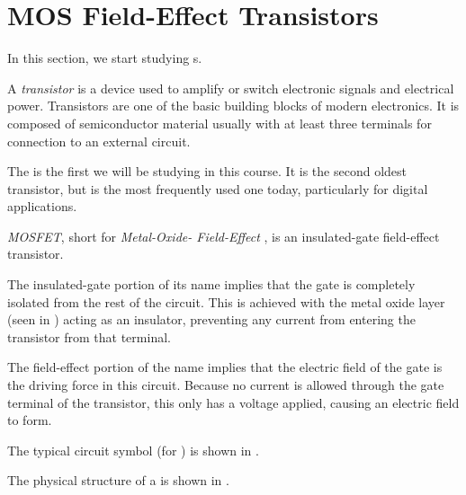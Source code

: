 \section{MOS Field-Effect Transistors}\label{sec:MOSFETs}
In this section, we start studying s.

\begin{definition}[Transistor]\label{def:Transistor}
  A \emph{transistor} is a  device used to amplify or switch electronic signals and electrical power.
  Transistors are one of the basic building blocks of modern electronics.
  It is composed of semiconductor material usually with at least three terminals for connection to an external circuit.
\end{definition}

The  is the first  we will be studying in this course.
It is the second oldest transistor, but is the most frequently used one today, particularly for digital applications.

\begin{definition}[MOSFET]\label{def:MOSFET}
  \emph{MOSFET}, short for \emph{Metal-Oxide- Field-Effect }, is an insulated-gate field-effect transistor.

  The insulated-gate portion of its name implies that the gate is completely isolated from the rest of the circuit.
  This is achieved with the metal oxide layer (seen in ) acting as an insulator, preventing any current from entering the transistor from that terminal.

  The field-effect portion of the name implies that the electric field of the gate is the driving force in this circuit.
  Because no current is allowed through the gate terminal of the transistor, this only has a voltage applied, causing an electric field to form.

  The typical circuit symbol (for ) is shown in .
\end{definition}

The physical structure of a  is shown in .

